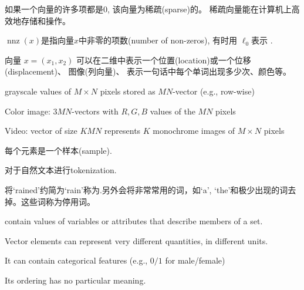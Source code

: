 \begin{definition}[稀疏向量]
    如果一个向量的许多项都是0, 该向量为稀疏(sparse)的。 稀疏向量能在计算机上高效地存储和操作。 

$\operatorname{nnz}(x)$是指向量$x$中非零的项数(number of non-zeros), 有时用 $\ell_0$表示 . 

\end{definition}

向量 $  x=\left(x_{1}, x_{2}\right)  $ 可以在二维中表示一个位置(location)或一个位移(displacement)、 图像(列向量)、 表示一句话中每个单词出现多少次、颜色等。 

\begin{example}
    grayscale values of $ M \times N $ pixels stored as $ M N $-vector (e.g., row-wise)

    Color image: $ 3 M N $-vectors with $ {R}, {G}, {B} $ values of the $ M N $ pixels

    Video: vector of size $ K M N $ represents $ K $ monochrome images of $ M \times N $ pixels
\end{example}

\begin{example}[时间序列]
    每个元素是一个样本(sample).
\end{example}

\begin{example}[自然文本进行tokenization]
    对于自然文本进行tokenization.

    将`rained'约简为`rain'称为.另外会将非常常用的词，如`a', `the'和极少出现的词去掉。这些词称为停用词。
\end{example}

\begin{example}
    contain values of variables or attributes that describe members of a set.
\end{example}

\begin{remark}
    Vector elements can represent very different quantities, in different units.
\end{remark}

\begin{remark}
    It can contain categorical features (e.g., $0/1$ for male/female)
\end{remark}

\begin{remark}
    Its ordering has no particular meaning.
\end{remark}

